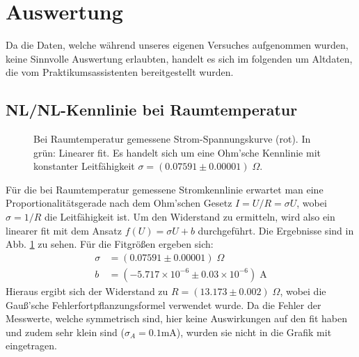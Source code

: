 \documentclass[twoside,        %
               BCOR12mm,       %
               english,ngerman, %
               fleqn,headsepline=false,footsepline=false
              ]{Vorlage/MFPREPORT}
\begin{document}
\section{Auswertung}
\label{sec:auswertung}
Da die Daten, welche während unseres eigenen Versuches aufgenommen wurden,
keine Sinnvolle Auswertung erlaubten, handelt es sich im folgenden um Altdaten,
die vom Praktikumsassistenten bereitgestellt wurden.
\subsection{NL/NL-Kennlinie bei Raumtemperatur}
\begin{figure}[]
    \centering
    
    \caption{Bei Raumtemperatur gemessene Strom-Spannungskurve (rot). In grün:
    Linearer fit. Es handelt sich
    um eine Ohm'sche Kennlinie mit konstanter Leitfähigkeit 
    $\sigma=(0.07591\pm0.00001)\;\Omega$.}
    \label{fig:1}
\end{figure}
Für die bei Raumtemperatur gemessene Stromkennlinie erwartet man eine
Proportionalitätsgerade nach dem Ohm'schen Gesetz $I=U/R=\sigma U$, wobei
$\sigma=1/R$ die Leitfähigkeit ist. Um den Widerstand zu
ermitteln, wird also ein linearer fit mit dem Ansatz $f(U)=\sigma U+b$ durchgeführt. Die Ergebnisse sind in Abb.
\ref{fig:1} zu sehen. Für die Fitgrößen ergeben sich:
\begin{align}
    \sigma&=(0.07591\pm0.00001)\;\Omega\\
    b&=(-5.717\times10^{-6}\pm0.03\times10^{-6})\;\text{A}
    \label{eq:linfit}
\end{align}
Hieraus ergibt sich der Widerstand zu $R=(13.173\pm0.002)\;\Omega$, wobei die
Gauß'sche Fehlerfortpflanzungsformel verwendet wurde. Da die Fehler der
Messwerte, welche
symmetrisch sind,
hier keine Auswirkungen auf den fit haben und zudem sehr klein sind
($\sigma_A=0.1$\;mA), wurden sie nicht in die Grafik mit eingetragen.
\end{document}
